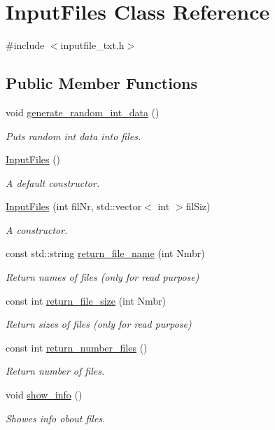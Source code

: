 \hypertarget{class_input_files}{}\section{Input\+Files Class Reference}
\label{class_input_files}


{\ttfamily \#include $<$inputfile\+\_\+txt.\+h$>$}

\subsection*{Public Member Functions}
\begin{DoxyCompactItemize}
\item 
void \hyperlink{class_input_files_ae5bb1d7ff253b873327a3a3d84f64584}{generate\+\_\+random\+\_\+int\+\_\+data} ()
\begin{DoxyCompactList}\small\item\em Puts random int data into files. \end{DoxyCompactList}\item 
\hyperlink{class_input_files_a85a092f7ad25a9f959f1a93e5afb2045}{Input\+Files} ()
\begin{DoxyCompactList}\small\item\em A default constructor. \end{DoxyCompactList}\item 
\hyperlink{class_input_files_a500e1a86787be57b9525836c6c912311}{Input\+Files} (int fil\+Nr, std\+::vector$<$ int $>$fil\+Siz)
\begin{DoxyCompactList}\small\item\em A constructor. \end{DoxyCompactList}\item 
const std\+::string \hyperlink{class_input_files_a9246bc217efcfa1569478bcf44e1cd20}{return\+\_\+file\+\_\+name} (int Nmbr)
\begin{DoxyCompactList}\small\item\em Return names of files (only for read purpose) \end{DoxyCompactList}\item 
const int \hyperlink{class_input_files_a9c65bfcc0e684642c40c999959d6d014}{return\+\_\+file\+\_\+size} (int Nmbr)
\begin{DoxyCompactList}\small\item\em Return sizes of files (only for read purpose) \end{DoxyCompactList}\item 
const int \hyperlink{class_input_files_a3db5accd81913e0b89fdd3b4650c8923}{return\+\_\+number\+\_\+files} ()
\begin{DoxyCompactList}\small\item\em Return number of files. \end{DoxyCompactList}\item 
void \hyperlink{class_input_files_adacb161e743183a2acef22b26dc7b954}{show\+\_\+info} ()
\begin{DoxyCompactList}\small\item\em Showes info obout files. \end{DoxyCompactList}\end{DoxyCompactItemize}
